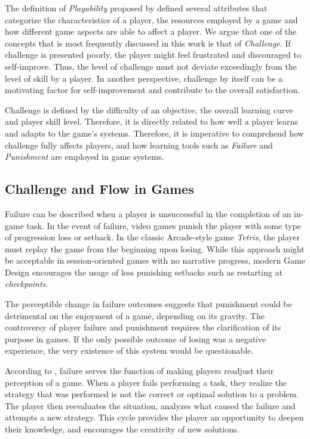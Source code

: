 The definition of \emph{Playability} proposed by \citet{ARTICLE_FromUsabilityToPlayability} defined several attributes that categorize the characteristics of a player, the resources employed by a game and how different game aspects are able to affect a player. We argue that one of the concepts that is most frequently discussed in this work is that of  \emph{Challenge}. If challenge is presented poorly, the player might feel frustrated and discouraged to self-improve. Thus, the level of challenge must not deviate exceedingly from the level of skill by a player. In another perspective, challenge by itself can be a motivating factor for self-improvement and contribute to the overall satisfaction.  

Challenge is defined by the difficulty of an objective, the overall learning curve and player skill level. Therefore, it is directly related to how well a player learns and adapts to the game's systems. Therefore, it is imperative to comprehend how challenge fully affects players, and how learning tools such as \emph{Failure} and \emph{Punishment} are employed in game systems.

\subsection{Challenge and Flow in Games}
\label{sec:challenge-flow}

Failure can be described when a player is unsuccessful in the completion of an in-game task. In the event of failure, video games punish the player with some type of progression loss or setback. In the classic Arcade-style game \emph{Tetris}, the player must replay the game from the beginning upon losing. While this approach might be acceptable in session-oriented games with no narrative progress, modern Game Design encourages the usage of less punishing setbacks such as restarting at \emph{checkpoints}.

The perceptible change in failure outcomes suggests that punishment could be detrimental on the enjoyment of a game, depending on its gravity. The controversy of player failure and punishment requires the clarification of its purpose in games. If the only possible outcome of losing was a negative experience, the very existence of this system would be questionable.

According to \cite{ARTICLE_FearOfFailure}, failure serves the function of making players readjust their perception of a game. When a player fails performing a task, they realize the strategy that was performed is not the correct or optimal solution to a problem. The player then reevaluates the situation, analyzes what caused the failure and attempts a new strategy. This cycle provides the player an opportunity to deepen their knowledge, and encourages the creativity of new solutions.

